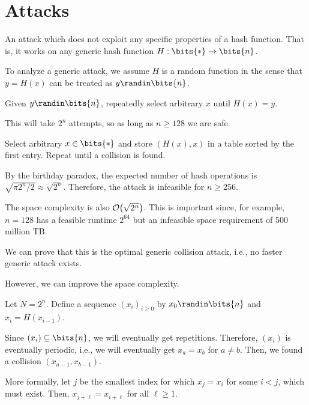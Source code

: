 \documentclass[class=co487,tikz,minted,notes]{agony}
\begin{document}
\section{Attacks}

\begin{defn}
  An attack which does not exploit any specific properties of a hash function.
  That is, it works on any generic hash function $H : \bits{*} \to \bits{n}$.
\end{defn}

To analyze a generic attack, we assume $H$ is a random function
in the sense that $y = H(x)$ can be treated as $y \randin \bits{n}$.

\begin{attack}
  Given $y \randin\bits{n}$, repeatedly select arbitrary $x$ until $H(x) = y$.
\end{attack}

This will take $2^n$ attempts, so as long as $n \geq 128$ we are safe.

\begin{attack}
  Select arbitrary $x \in \bits{*}$ and store $(H(x),x)$ in a table
  sorted by the first entry. Repeat until a collision is found.
\end{attack}

By the birthday paradox, the expected number of hash operations is
$\sqrt{\pi 2^n/2} \approx \sqrt{2^n}$.
Therefore, the attack is infeasible for $n \geq 256$.

The space complexity is also $\order{\sqrt{2^n}}$.
This is important since, for example, $n=128$ has a feasible runtime $2^{64}$
but an infeasible space requirement of 500 million TB.

We can prove that this is the optimal generic collision attack, i.e.,
no faster generic attack exists.

However, we can improve the space complexity.

Let $N = 2^n$.
Define a sequence $(x_i)_{i\geq0}$ by $x_0 \randin \bits{n}$
and $x_i = H(x_{i-1})$.

Since $(x_i) \subseteq \bits{n}$, we will eventually get repetitions.
Therefore, $(x_i)$ is eventually periodic, i.e.,
we will eventually get $x_a = x_b$ for $a \neq b$.
Then, we found a collision $(x_{a-1}, x_{b-1})$.

More formally, let $j$ be the smallest index for which $x_j = x_i$
for some $i < j$, which must exist.
Then, $x_{j+\ell} = x_{i+\ell}$ for all $\ell \geq 1$.
\end{document}
